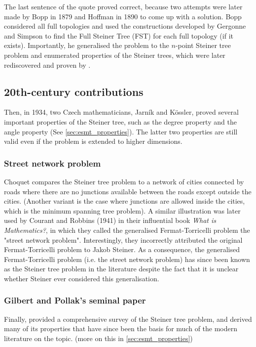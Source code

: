 \documentclass{l4proj}
\begin{document}
The last sentence of the quote proved correct, because two attempts were later made by Bopp in 1879 and Hoffman in 1890 to come up with a solution. Bopp considered all full topologies and used the constructions developed by Gergonne and Simpson to find the Full Steiner Tree (FST) for each full topology (if it exists). Importantly, he generalised the problem to the $n$-point Steiner tree problem and enumerated properties of the Steiner trees, which were later rediscovered and proven by \cite{Gilbert1968SteinerMT}.

\subsection{20th-century contributions}
Then, in 1934, two Czech mathematicians, Jarník and Kössler, proved several important properties of the Steiner tree, such as the degree property and the angle property (See \ref{sec:esmt_properties}). The latter two properties are still valid even if the problem is extended to higher dimensions.

\subsubsection{Street network problem}
Choquet compares the Steiner tree problem to a network of cities connected by roads where there are no junctions available between the roads except outside the cities. (Another variant is the case where junctions are allowed inside the cities, which is the minimum spanning tree problem).
A similar illustration was later used by Courant and Robbins (1941) in their influential book \textit{What is Mathematics?}, in which they called the generalised Fermat-Torricelli problem the "street network problem". Interestingly, they incorrectly attributed the original Fermat-Torricelli problem to Jakob Steiner. As a consequence, the generalised Fermat-Torricelli problem (i.e. the street network problem) has since been known as the Steiner tree problem in the literature despite the fact that it is unclear whether Steiner ever considered this generalisation.

\subsubsection{Gilbert and Pollak's seminal paper}
Finally, \cite{Gilbert1968SteinerMT} provided a comprehensive survey of the Steiner tree problem, and derived many of its properties that have since been the basis for much of the modern literature on the topic. (more on this in \ref{sec:esmt_properties})
\end{document}
